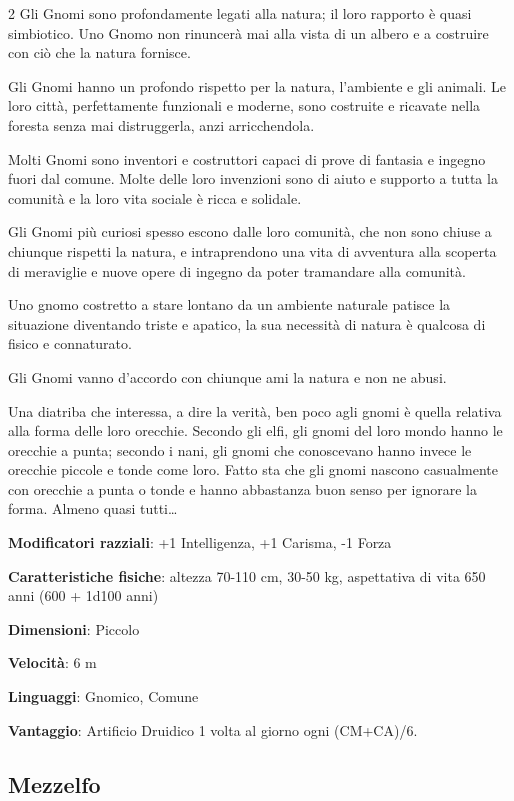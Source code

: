 \begin{multicols}{2}
Gli Gnomi sono profondamente legati alla natura; il loro rapporto è quasi simbiotico. Uno Gnomo non rinuncerà mai alla vista di un albero e a costruire con ciò che la natura fornisce.

Gli Gnomi hanno un profondo rispetto per la natura, l'ambiente e gli animali. Le loro città, perfettamente funzionali e moderne, sono costruite e ricavate nella foresta senza mai distruggerla, anzi arricchendola.

Molti Gnomi sono inventori e costruttori capaci di prove di fantasia e ingegno fuori dal comune. Molte delle loro invenzioni sono di aiuto e supporto a tutta la comunità e la loro vita sociale è ricca e solidale.

Gli Gnomi più curiosi spesso escono dalle loro comunità, che non sono chiuse a chiunque rispetti la natura, e intraprendono una vita di avventura alla scoperta di meraviglie e nuove opere di ingegno da poter tramandare alla comunità.

Uno gnomo costretto a stare lontano da un ambiente naturale patisce la situazione diventando triste e apatico, la sua necessità di natura è qualcosa di fisico e connaturato.

Gli Gnomi vanno d'accordo con chiunque ami la natura e non ne abusi.

Una diatriba che interessa, a dire la verità, ben poco agli gnomi è quella relativa alla forma delle loro orecchie. Secondo gli elfi, gli gnomi del loro mondo hanno le orecchie a punta; secondo i nani, gli gnomi che conoscevano hanno invece le orecchie piccole e tonde come loro. Fatto sta che gli gnomi nascono casualmente con orecchie a punta o tonde e hanno abbastanza buon senso per ignorare la forma. Almeno quasi tutti…

\textbf{Modificatori razziali}: +1 Intelligenza, +1 Carisma, -1 Forza

\textbf{Caratteristiche fisiche}: altezza 70-110 cm, 30-50 kg, aspettativa di vita 650 anni (600 + 1d100 anni)

\textbf{Dimensioni}: Piccolo

\textbf{Velocità}: 6 m

\textbf{Linguaggi}: Gnomico, Comune

\textbf{Vantaggio}: Artificio Druidico 1 volta al giorno ogni (CM+CA)/6.

\subsection{Mezzelfo}\label{mezzelfo}


\end{multicols}
